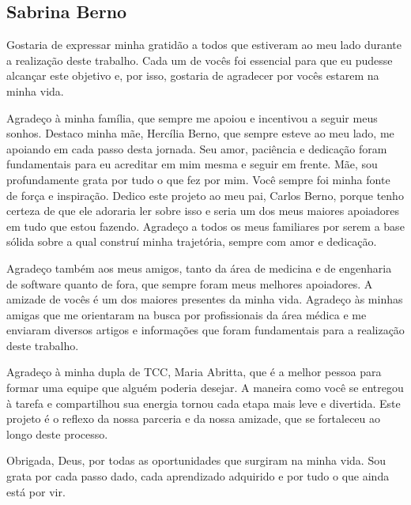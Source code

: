 \begin{agradecimentos}
\section*{Sabrina Berno}

Gostaria de expressar minha gratidão a todos que estiveram ao meu lado durante a realização deste trabalho. Cada um de vocês foi essencial para que eu pudesse alcançar este objetivo e, por isso, gostaria de agradecer por vocês estarem na minha vida.

Agradeço à minha família, que sempre me apoiou e incentivou a seguir meus sonhos. Destaco minha mãe, Hercília Berno, que sempre esteve ao meu lado, me apoiando em cada passo desta jornada. Seu amor, paciência e dedicação foram fundamentais para eu acreditar em mim mesma e seguir em frente. Mãe, sou profundamente grata por tudo o que fez por mim. Você sempre foi minha fonte de força e inspiração. Dedico este projeto ao meu pai, Carlos Berno, porque tenho certeza de que ele adoraria ler sobre isso e seria um dos meus maiores apoiadores em tudo que estou fazendo. Agradeço a todos os meus familiares por serem a base sólida sobre a qual construí minha trajetória, sempre com amor e dedicação.

Agradeço também aos meus amigos, tanto da área de medicina e de engenharia de software quanto de fora, que sempre foram meus melhores apoiadores. A amizade de vocês é um dos maiores presentes da minha vida. Agradeço às minhas amigas que me orientaram na busca por profissionais da área médica e me enviaram diversos artigos e informações que foram fundamentais para a realização deste trabalho.

Agradeço à minha dupla de TCC, Maria Abritta, que é a melhor pessoa para formar uma equipe que alguém poderia desejar. A maneira como você se entregou à tarefa e compartilhou sua energia tornou cada etapa mais leve e divertida. Este projeto é o reflexo da nossa parceria e da nossa amizade, que se fortaleceu ao longo deste processo.

Obrigada, Deus, por todas as oportunidades que surgiram na minha vida. Sou grata por cada passo dado, cada aprendizado adquirido e por tudo o que ainda está por vir.

\end{agradecimentos}
